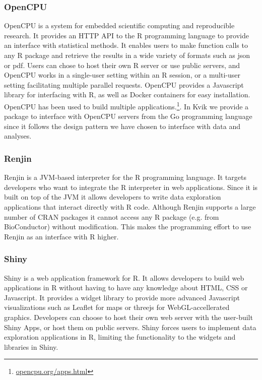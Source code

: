 
\subsubsection*{OpenCPU} 
OpenCPU is a system for embedded scientific computing and reproducible
research.\cite{opencpu} It provides an HTTP API to the R programming language to
provide an interface with statistical methods. It enables users to make function
calls to any R package and retrieve the results in a wide variety of formats
such as json or pdf. 
Users can chose to host their own R server or use public servers, and OpenCPU
works in a single-user setting within an R session, or a multi-user setting
facilitating multiple parallel requests. 
OpenCPU provides a Javascript library for interfacing with R, as well as Docker
containers for easy installation. OpenCPU has been used to build multiple
applications.\footnote{\url{opencpu.org/apps.html}}.
In Kvik we provide a package
to interface with OpenCPU servers from the Go programming language since it
follows the design pattern we have chosen to interface with data and analyses. 


\subsubsection*{Renjin} 
Renjin is a JVM-based interpreter for the R programming language.\cite{renjin}
It targets developers who want to integrate the R interpreter in web
applications. Since it is built on top of the JVM it allows developers to write
data exploration applications that interact directly with R code. Although
Renjin supports a large number of CRAN packages it cannot access any R package
(e.g. from BioConductor) without modification. This makes the programming effort
to use Renjin as an interface with R higher. 

\subsubsection*{Shiny} 
Shiny is a web application framework for R.\cite{shiny} It allows developers to
build web applications in R without having to have any knowledge about HTML, CSS
or Javascript. It provides a widget library to provide more advanced Javascript
visualizations such as Leaflet for maps or threejs for WebGL-accellerated
graphics. Developers can choose to host their own web server with the user-built
Shiny Apps, or host them on public servers. Shiny forces users to implement data
exploration applications in R, limiting the functionality to the 
widgets and libraries in Shiny. 

